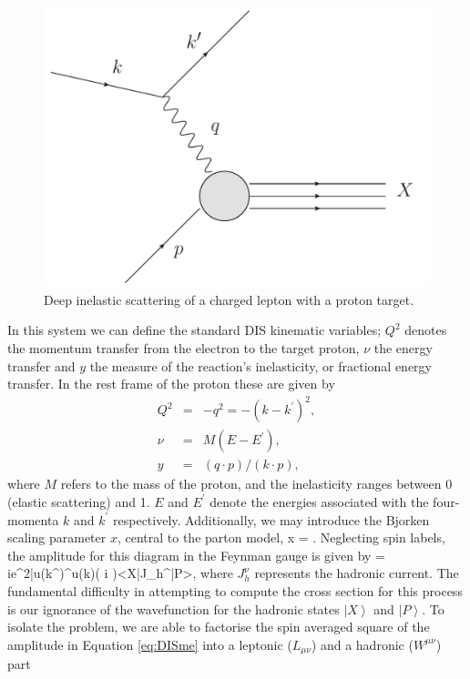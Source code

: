 \begin{figure}[ht]
\centering
\includegraphics[scale=0.5]{2-PDFs/figs/DIS.pdf}
\caption{Deep inelastic scattering of a charged lepton with a proton target.}
\label{fig:DIS}
\end{figure}
In this system we can define the standard DIS kinematic variables;  $Q^2$ denotes the momentum transfer from the electron to the target proton, $\nu$ the energy transfer and $y$ the measure of the reaction's inelasticity, or fractional energy transfer. In the rest frame of the proton these are given by
\begin{eqnarray}
 Q^2 &=& -q^2 = -(k - k^{\prime})^2, \\
 \nu &=& M(E- E^\prime), \\
 y &=& (q \cdot p)/(k \cdot p),
\end{eqnarray}
where $M$ refers to the mass of the proton, and the inelasticity ranges between 0 (elastic scattering) and 1. $E$ and $E^\prime$ denote the energies associated with the four-momenta $k$ and $k^\prime$ respectively. Additionally, we may introduce the Bjorken scaling parameter $x$, central to the parton model,
\be x = . \ee
Neglecting spin labels, the amplitude for this diagram in the Feynman gauge is given by
\be{} = ie^2\bar{u}(k^\prime)\gamma^\mu u(k)\left( i \right)\left<X\right|J_h^\nu\left|P\right>,  \label{eq:DISme}\ee
%
where $J_h^\nu$ represents the hadronic current. 
The fundamental difficulty in attempting to compute the cross section for this process is our ignorance of the wavefunction for the hadronic states $\left|X\right>$ and $\left|P\right>$. To isolate the problem, we are able to factorise the spin averaged square of the amplitude in Equation \ref{eq:DISme} into a leptonic ($L_{\mu\nu}$) and a hadronic ($W^{\mu\nu}$) part
